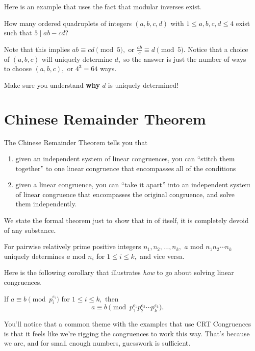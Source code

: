 \documentclass[mast]{lucky}
\begin{document}
Here is an example that uses the fact that modular inverses exist.

\begin{exam}
How many ordered quadruplets of integers $(a,b,c,d)$ with $1\leq a,b,c,d\leq 4$ exist such that $5\mid ab-cd$?
\end{exam}

\begin{sol}
Note that this implies $ab\equiv cd\pmod{5},$ or $\frac{ab}{c}\equiv d\pmod{5}.$ Notice that a choice of $(a,b,c)$ will uniquely determine $d,$ so the answer is just the number of ways to choose $(a,b,c),$ or $4^3=64$ ways.
\end{sol}

Make sure you understand \textbf{why} $d$ is uniquely determined!

\section{Chinese Remainder Theorem}
The Chinese Remainder Theorem tells you that
\begin{enumerate}
\item given an independent system of linear congruences, you can ``stitch them together'' to one linear congruence that encompasses all of the conditions
\item given a linear congruence, you can ``take it apart'' into an independent system of linear congruence that encompasses the original congruence, and solve them independently.
\end{enumerate}

We state the formal theorem just to show that in of itself, it is completely devoid of any substance.

\begin{theo}
For pairwise relatively prime positive integers $n_1,n_2,\ldots,n_k,$ $a$ mod $n_1n_2\cdots n_k$ uniquely determines $a$ mod $n_i$ for $1\leq i\leq k,$ and vice versa.
\end{theo}

Here is the following corollary that illustrates \textit{how} to go about solving linear congruences.

\begin{fact}
If $a\equiv b\pmod{p_i^{e_i}}$ for $1\leq i\leq k,$ then
\[a\equiv b\pmod{p_1^{e_1}p_2^{e_2}\cdots p_k^{e_k}}.\]
\end{fact}

You'll notice that a common theme with the examples that use CRT Congruences is that it feels like we're rigging the congruences to work this way. That's because we are, and for small enough numbers, guesswork is sufficient.
\end{document}
